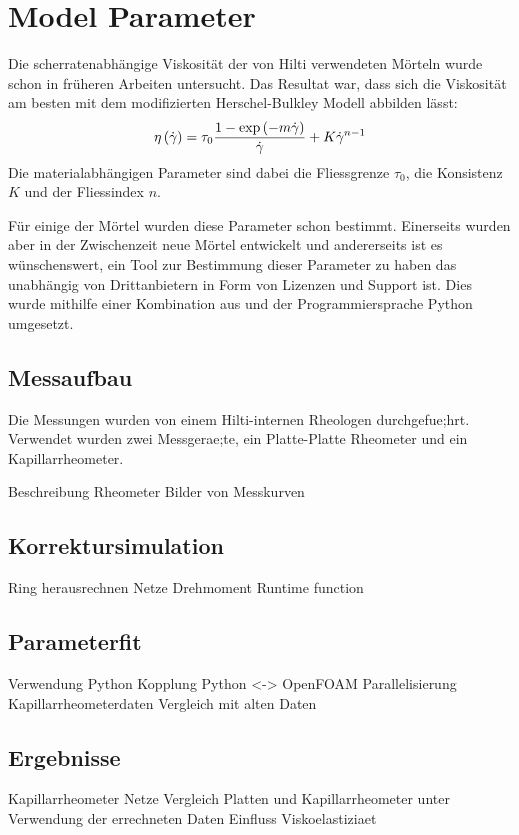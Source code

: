 \section{Model Parameter}
\label{Kapitel:Parameter}
Die scherratenabhängige Viskosität der von Hilti verwendeten Mörteln wurde schon in früheren Arbeiten untersucht. Das Resultat war, dass sich die Viskosität am besten mit dem modifizierten Herschel-Bulkley Modell abbilden lässt:
\begin{equation}
    \label{eq:modHB}
    \eta\left( \dot\gamma \right) = \tau_0 \frac{1-\exp \left( -m\dot\gamma \right)}{\dot\gamma}+K\dot\gamma^{n-1}
\end{equation}
Die materialabhängigen Parameter sind dabei die Fliessgrenze $\tau_0$, die Konsistenz $K$ und der Fliessindex $n$.

Für einige der Mörtel wurden diese Parameter schon bestimmt. Einerseits wurden aber in der Zwischenzeit neue Mörtel entwickelt und andererseits ist es wünschenswert, ein Tool zur Bestimmung dieser Parameter zu haben das unabhängig von Drittanbietern in Form von Lizenzen und Support ist.
Dies wurde mithilfe einer Kombination aus \openfoam{} und der Programmiersprache Python umgesetzt.
%
\subsection{Messaufbau}
Die Messungen wurden von einem Hilti-internen Rheologen durchgefue;hrt. Verwendet wurden zwei Messgerae;te, ein Platte-Platte Rheometer und ein Kapillarrheometer.
\begin{todocontent}
    \1 Beschreibung Rheometer
    \1 Bilder von Messkurven
\end{todocontent}
%
\subsection{Korrektursimulation}
\begin{todocontent}
    \1 Ring herausrechnen
    \1 Netze
    \1 Drehmoment Runtime function
\end{todocontent}
%
\subsection{Parameterfit}
\begin{todocontent}
    \1 Verwendung Python
    \1 Kopplung Python <-> OpenFOAM
    \1 Parallelisierung
    \1 Kapillarrheometerdaten
    \1 Vergleich mit alten Daten
\end{todocontent}
%
\subsection{Ergebnisse}
\begin{todocontent}
    \1 Kapillarrheometer Netze
    \1 Vergleich Platten und Kapillarrheometer unter Verwendung der errechneten Daten
    \1 Einfluss Viskoelastiziaet
\end{todocontent}
%
